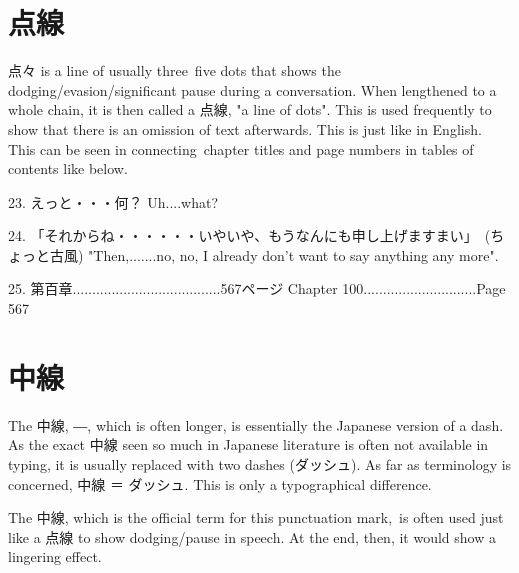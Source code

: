 \section{点線}
 
\par{ 点々 is a line of usually three~five dots that shows the dodging\slash evasion\slash significant pause during a conversation. When lengthened to a whole chain, it is then called a 点線, "a line of dots". This is used frequently to show that there is an omission of text afterwards. This is just like in English. This can be seen in connecting chapter titles and page numbers in tables of contents like below. }

\par{23. えっと・・・何？ \hfill\break
Uh\dothyp{}\dothyp{}\dothyp{}.what? }

\par{24. 「それからね・・・・・・いやいや、もうなんにも申し上げますまい」　(ちょっと古風) \hfill\break
"Then,\dothyp{}\dothyp{}\dothyp{}\dothyp{}\dothyp{}\dothyp{}.no, no, I already don't want to say anything any more". }

\par{25. 第百章\dothyp{}\dothyp{}\dothyp{}\dothyp{}\dothyp{}\dothyp{}\dothyp{}\dothyp{}\dothyp{}\dothyp{}\dothyp{}\dothyp{}\dothyp{}\dothyp{}\dothyp{}\dothyp{}\dothyp{}\dothyp{}\dothyp{}\dothyp{}\dothyp{}\dothyp{}\dothyp{}\dothyp{}\dothyp{}\dothyp{}\dothyp{}\dothyp{}\dothyp{}\dothyp{}\dothyp{}\dothyp{}\dothyp{}\dothyp{}\dothyp{}\dothyp{}..567ページ \hfill\break
Chapter 100\dothyp{}\dothyp{}\dothyp{}\dothyp{}\dothyp{}\dothyp{}\dothyp{}\dothyp{}\dothyp{}\dothyp{}\dothyp{}\dothyp{}\dothyp{}\dothyp{}\dothyp{}\dothyp{}\dothyp{}\dothyp{}\dothyp{}\dothyp{}\dothyp{}\dothyp{}\dothyp{}\dothyp{}\dothyp{}\dothyp{}\dothyp{}..Page 567 }
      
\section{中線}
 
\par{ The 中線, ―, which is often longer, is essentially the Japanese version of a dash. As the exact 中線 seen so much in Japanese literature is often not available in typing, it is usually replaced with two dashes (ダッシュ). As far as terminology is concerned, 中線 ＝ ダッシュ. This is only a typographical difference. }

\par{ The 中線, which is the official term for this punctuation mark, is often used just like a 点線 to show dodging\slash pause in speech. At the end, then, it would show a lingering effect. }

